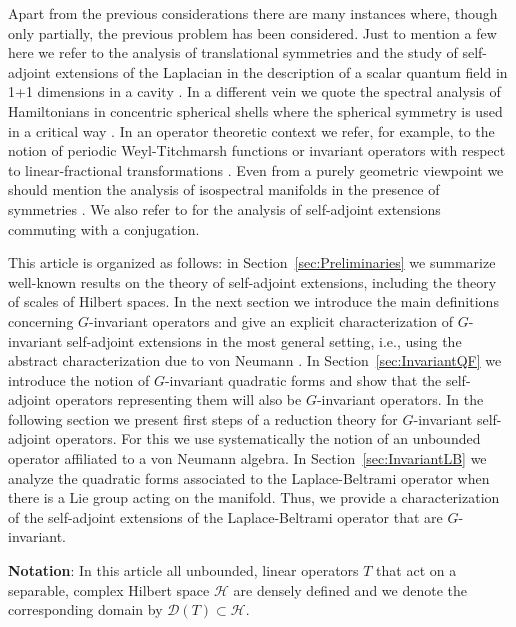 \documentclass[a4paper,12pt]{amsart}
\renewcommand{\H}{\mathcal{H}}
\newcommand{\D}{\mathcal{D}}
\newcommand{\1}{\mathbb{I}}
\numberwithin{equation}{section}
\numberwithin{theorem}{section}
\begin{document}
Apart from the previous considerations there are many instances where, though only partially, the previous problem has been considered.   
Just to mention a few here we refer to the analysis of translational symmetries and the study of self-adjoint 
extensions of the Laplacian in the description of a scalar quantum field in 1+1 dimensions in a cavity \cite{asorey06}.   
In a different vein we quote the spectral analysis of Hamiltonians in concentric spherical shells where the spherical symmetry is used 
in a critical way \cite{dittrich92,exner07}. In an operator theoretic context we refer, for example, to the notion of periodic Weyl-Titchmarsh
functions or invariant operators with respect to linear-fractional transformations
\cite{bekker04,bekker07}.
Even from a purely geometric viewpoint we should mention the analysis of isospectral 
manifolds in the presence of symmetries \cite{shams06}. We also refer to 
\cite[Section~13.5]{schmuedgen12} for the analysis of self-adjoint extensions commuting 
with a conjugation.


This article is organized as follows: in Section~\ref{sec:Preliminaries} we summarize well-known results on the theory of 
self-adjoint extensions, including the theory of scales of Hilbert spaces. In the next section
we introduce the main definitions concerning $G$-invariant operators and give an explicit
characterization of $G$-invariant self-adjoint extensions in the most general setting, i.e., using the 
abstract characterization due to von Neumann \cite{neumann30}. 
In Section~\ref{sec:InvariantQF} we introduce the notion of $G$-invariant quadratic forms and show
that the self-adjoint operators representing them will also be $G$-invariant operators. In the following section we present first steps of a 
reduction theory for $G$-invariant self-adjoint operators. For this we use 
systematically the notion of an unbounded operator affiliated to a von Neumann algebra.
In Section~\ref{sec:InvariantLB} we analyze the quadratic forms associated to the
Laplace-Beltrami operator when there is a Lie group acting on the manifold. Thus, we provide a characterization of the self-adjoint
extensions of the Laplace-Beltrami operator that are $G$-invariant.

{\bf Notation}: In this article all unbounded, linear operators $T$ that act on a separable, complex Hilbert space $\H$ are 
densely defined and we denote the corresponding domain by $\D(T)\subset\H$.
\end{document}
